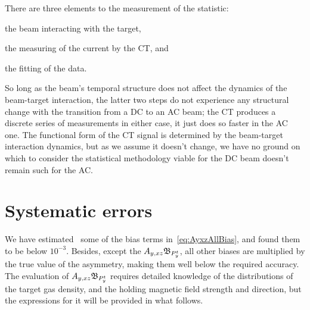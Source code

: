 \documentclass{article}
\newcommand{\bias}[1]{\mathfrak{B}_{#1}}
\begin{document}
There are three elements to the measurement of the statistic: \begin{inparaenum}[1)]
	\item the beam interacting with the target,
	\item the measuring of the current by the CT, and
	\item the fitting of the data.
\end{inparaenum} 
So long as the beam's temporal structure does not affect the dynamics of the beam-target interaction, the latter two steps do not experience any structural change with the transition from a DC to an AC beam; the CT produces a discrete series of measurements in either case, it just does so faster in the AC one. The functional form of the CT signal is determined by the beam-target interaction dynamics, but as we assume it doesn't change, we have no ground on which to consider the statistical methodology viable for the DC beam doesn't remain such for the AC.
 
\section{Systematic errors}

We have estimated~\cite{Diploma} some of the bias terms in~\eqref{eq:AyxzAllBias}, and found them to be below $10^{-3}$. Besides, except the $\Ayxz\bias{P^t_y}$, all other biases are multiplied by the true value of the asymmetry, making them well below the required accuracy. The evaluation of $\Ayxz\bias{P^t_y}$ requires detailed knowledge of the distributions of the target gas density, and the holding magnetic field strength and direction, but the expressions for it will be provided in what follows.

%
%
%
\end{document}
